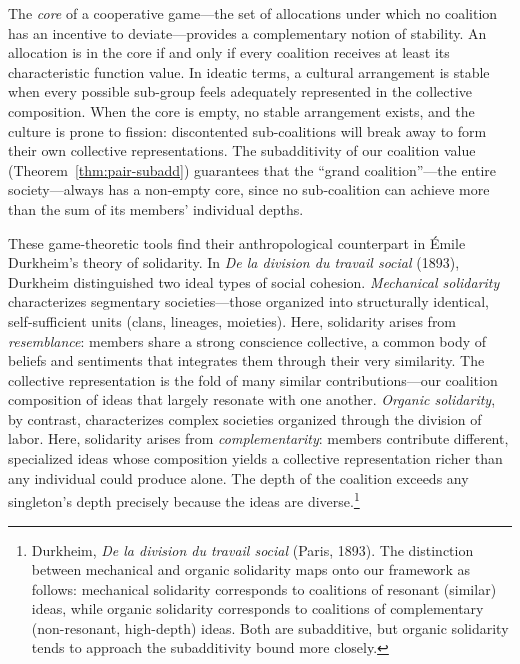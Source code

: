 The \emph{core} of a cooperative game---the set of allocations under which
no coalition has an incentive to deviate---provides a complementary notion of
stability.  An allocation is in the core if and only if every coalition
receives at least its characteristic function value.  In ideatic terms,
a cultural arrangement is stable when every possible sub-group feels
adequately represented in the collective composition.  When the core is
empty, no stable arrangement exists, and the culture is prone to fission:
discontented sub-coalitions will break away to form their own collective
representations.  The subadditivity of our coalition value
(Theorem~\ref{thm:pair-subadd}) guarantees that the ``grand coalition''---the
entire society---always has a non-empty core, since no sub-coalition can
achieve more than the sum of its members' individual depths.

These game-theoretic tools find their anthropological counterpart in
Émile Durkheim's theory of solidarity.  In \textit{De la division du travail
social} (1893), Durkheim distinguished two ideal types of social cohesion.
\emph{Mechanical solidarity} characterizes segmentary societies---those
organized into structurally identical, self-sufficient units (clans,
lineages, moieties).  Here, solidarity arises from \emph{resemblance}:
members share a strong conscience collective, a common body of beliefs and
sentiments that integrates them through their very similarity.  The
collective representation is the fold of many similar contributions---our
coalition composition of ideas that largely resonate with one another.
\emph{Organic solidarity}, by contrast, characterizes complex societies
organized through the division of labor.  Here, solidarity arises from
\emph{complementarity}: members contribute different, specialized ideas
whose composition yields a collective representation richer than any
individual could produce alone.  The depth of the coalition exceeds any
singleton's depth precisely because the ideas are diverse.\footnote{Durkheim,
\textit{De la division du travail social} (Paris, 1893).  The distinction
between mechanical and organic solidarity maps onto our framework as follows:
mechanical solidarity corresponds to coalitions of resonant (similar) ideas,
while organic solidarity corresponds to coalitions of complementary
(non-resonant, high-depth) ideas.  Both are subadditive, but organic
solidarity tends to approach the subadditivity bound more closely.}

